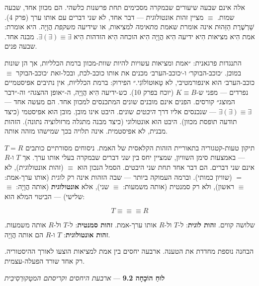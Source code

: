 \documentclass[10pt, openany, oneside]{book}
\begin{document}
אלה אינם שבעה שיעורים שבמקרה מסכימים תחת פרשנות כלשהי. הם מכוון אחד, שבעה שמות. $\equiv$ מציין זהות אונטולוגית — דבר אחד, לא שני דברים עם אותו ערך (פרק 4). שַׁרְשֶׁרֶת הַזֵּהוּת אינה אומרת שאמת \textit{מתאימה} למציאות, או שידיעה \textit{משקפת} הֲוָיָה. היא אומרת: אמת הִיא מציאות הִיא ידיעה הִיא הֲוָיָה הִיא הוכחה הִיא הזדהות הִיא $\exists(\exists) \equiv \exists$. מבנה אחד. שבעה פנים.

התנגדות פרגאנית: ״אמת ומציאות עשויות להיות שוות-מכוון ברמת הכלליות, אך הן שונות ב\textit{מובן}. ׳כוכב-הבוקר׳ ו-׳כוכב-הערב׳ מכנים את אותו כוכב-לכת, ובכל-זאת ׳כוכב-הבוקר $\equiv$ כוכב-הערב׳ הוא אינפורמטיבי, לא טָאוּטוֹלוֹגִי.״ הפירוק: ברמת הכלליות, אין נתיבים אפיסטמיים נפרדים — מפני ש-$K \equiv B$ (יוכח בפרק 10). כש-ידיעה הִיא הֲוָיָה, ה-״אופן ההצגה״ וה-״דבר המוצג״ קורסים. הפנים אינם מובנים שונים המתכנסים למכוון אחד. הם מעשה אחד — $\exists(\exists) \equiv \exists$ — שנכנסים אליו דרך \textit{היבטים} שונים. היבט אינו מובן. מובן הוא אפיסטמי (כיצד תודעה תופסת מכוון). היבט הוא אונטולוגי (כיצד מבנה מתגלה מרזולוציה נתונה). הזהות מבנית, לא אפיסטמית. אינה תלויה בכך שמישהו מזהה אותה.

תיקון טעות-קטגוריה בתאוריית הזהות הקלאסית של האמת. ניסוחים מסורתיים כותבים $T = R$ — באמצעות סימן השוויון, שמציין יחס בין \textit{שני} דברים שבמקרה בעלי אותו ערך. אך $T$ ו-$R$ אינם שני דברים. הם דבר אחד תחת שני היבטים. הסמל הנכון הוא $\equiv$ (זהות אונטולוגית), לא $=$ (שוויון כמותי). וברמה העמוקה ביותר — שבה הזהות אינה רק לוגית (אותו ערך-אמת: $\equiv$ ראשון), ולא רק סמנטית (אותה משמעות: $\equiv$ שני), אלא \textbf{אונטולוגית} (אותה הֲוָיָה: $\equiv$ שלישי) — הביטוי המלא הוא:

$$T \equiv\!\equiv\!\equiv R$$

שלושה קווים. \textbf{זהות לוגית}: ל-$T$ ול-$R$ אותו ערך-אמת. \textbf{זהות סמנטית}: ל-$T$ ול-$R$ אותה משמעות. \textbf{זהות אונטולוגית}: $T$ ו-$R$ הם אותה הֲוָיָה.

הבחנה נוספת מחדדת את הטענה. ארבעה יחסים בין אמת למציאות הוצעו לאורך ההיסטוריה. רק אחד שורד הפעלה-עצמית.

\vspace{0.5em}

\textbf{לוּחַ הוֹכָחָה 9.2} --- \textit{ארבעת היחסים וקריסתם המטָקוּרְסִיבִית}

\vspace{0.5em}
\end{document}
